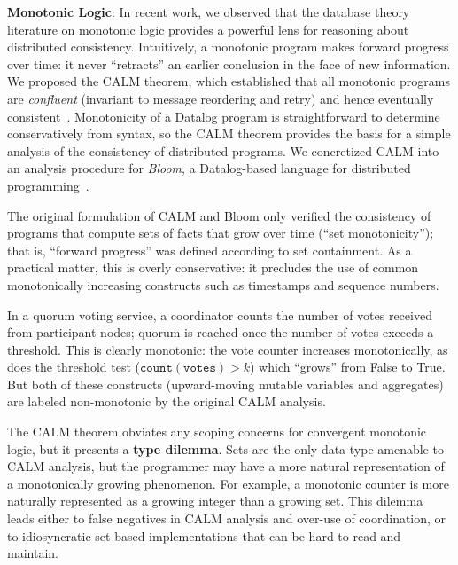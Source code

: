 
\vspace{0.5em} \noindent
\textbf{Monotonic Logic}: In recent work, we observed that the database theory
literature on monotonic logic provides a powerful lens for reasoning about
distributed consistency. Intuitively, a monotonic program makes forward progress
over time: it never ``retracts'' an earlier conclusion in the face of new
information. We proposed the CALM theorem, which established that all monotonic
programs are \emph{confluent} (invariant to message reordering and retry) and
hence eventually
consistent~\cite{Ameloot2011,Hellerstein2010,dedalus-confluence}. Monotonicity
of a Datalog program is straightforward to determine conservatively from syntax,
so the CALM theorem provides the basis for a simple analysis of the consistency of distributed programs. We concretized CALM into an
analysis procedure for \emph{Bloom}, a Datalog-based language for distributed
programming~\cite{Alvaro2011,bloom}.

The original formulation of CALM and Bloom only verified the consistency of
programs that compute sets of facts that grow over time (``set monotonicity'');
that is, ``forward progress'' was defined according to set containment. As a
practical matter, this is overly conservative: it precludes the use of common
monotonically increasing constructs such as timestamps and sequence numbers.

\vspace{-0.25em}
\begin{example}  In a
quorum voting service, a coordinator counts the number of votes received
from participant nodes; quorum is reached once the number of votes exceeds a
threshold. This is clearly monotonic: the vote counter increases
monotonically, as does the threshold test ($\mathtt{count(votes)} > k$) which ``grows'' from False to True. But both of these constructs (upward-moving
mutable variables and aggregates) are labeled non-monotonic by the
original CALM analysis.
\end{example}

\vspace{-.25em}
The CALM theorem obviates any scoping concerns for convergent monotonic logic, but it presents a \textbf{type dilemma}. Sets are the only data type amenable to CALM analysis, but the programmer may have a more natural representation of a monotonically growing phenomenon. For example, a monotonic counter is more naturally represented as a growing integer than a growing set. This dilemma leads either to false negatives in CALM analysis and over-use of coordination, or to idiosyncratic set-based implementations that can be hard to read and maintain.

